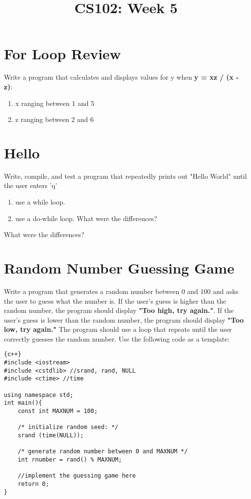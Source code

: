 \documentclass{article}
\begin{document}
\title{CS102: Week 5}

\maketitle

\section*{For Loop Review}
Write a program that calculates and displays values for y when \textbf{y = xz / (x - z)}:

\begin{enumerate}
 	\item x ranging between 1 and 5
	\item z ranging between 2 and 6
\end{enumerate}

\section*{Hello}
Write, compile, and test a program that repeatedly prints out "Hello World" until the user enters 'q'
\begin{enumerate}
	\item use a while loop.
	\item use a do-while loop. What were the differences?
\end{enumerate}
 What were the differences?

\section*{Random Number Guessing Game}
Write a program that generates a random number between 0 and 100 and asks the user to guess what the number is. If the user's guess is higher than the random number, the program should display \textbf{"Too high, try again."}. If the user's guess is lower than the random number, the program should display \textbf{"Too low, try again."} The program should use a loop that repeats until the user correctly guesses the random number. Use the following code as a template:
\begin{lstlisting}{c++}
#include <iostream>
#include <cstdlib> //srand, rand, NULL
#include <ctime> //time

using namespace std;
int main(){
	const int MAXNUM = 100;

	/* initialize random seed: */
	srand (time(NULL));

	/* generate random number between 0 and MAXNUM */
	int rnumber = rand() % MAXNUM;

	//implement the guessing game here
	return 0;
}
\end{lstlisting}
\end{document}
